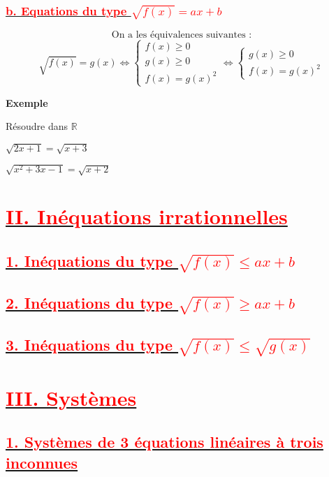 \documentclass[12pt]{article}
\begin{document}
 
\subsubsection*{\underline{\textbf{\textcolor{red}{b. Equations du type \( \sqrt{f(x)} = ax+b \) }}}}
 \[\text{On a les équivalences suivantes :}\]
	\[ \sqrt{ f(x)} = g(x) \Leftrightarrow \begin{cases}f(x) \geq 0 \\ g(x) \geq 0 \\ f(x) = g(x)^{2} \end{cases} \Leftrightarrow \begin{cases} g(x) \geq 0 \\ f(x) = g(x)^{2} \end{cases} \]

 \textbf{Exemple } 
 
 Résoudre dans $\mathbb{R}$
 
\( \sqrt{ 2x+1} = \sqrt{ x+3}  \)

\( \sqrt{ x^{2}+3x-1} = \sqrt{ x+2}  \)	
	
\section*{\underline{\textbf{\textcolor{red}{II. Inéquations irrationnelles}}}}

\subsection*{\underline{\textbf{\textcolor{red}{1. Inéquations du type \( \sqrt{f(x)} \leq ax+b \) }}}}
\subsection*{\underline{\textbf{\textcolor{red}{2. Inéquations du type \( \sqrt{f(x)} \geq ax+b \) }}}}
\subsection*{\underline{\textbf{\textcolor{red}{3. Inéquations du type \( \sqrt{f(x)} \leq  \sqrt{g(x)} \) }}}}

\section*{\underline{\textbf{\textcolor{red}{III. Systèmes}}}}
\subsection*{\underline{\textbf{\textcolor{red}{1. Systèmes de 3 équations linéaires à trois inconnues}}}}
\end{document}
